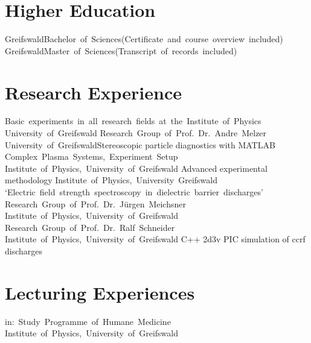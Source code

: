 \documentclass[11pt,a4paper]{moderncv}
\begin{document}
	\section{Higher Education} 
					{Greifswald}{Bachelor~of~Sciences}{(Certificate~and~course~overview~included)}
					{Greifswald}{Master~of~Sciences}{(Transcript~of~records~included)}
	
	\newpage
	\section{Research Experience}
					{Basic~experiments~in~all~research~fields~at~the~Institute~of~Physics\newline}{}%
					{University~of~Greifswald}{}
					{Research~Group~of~Prof.~Dr.~Andre~Melzer\newline}{}%
					{University~of~Greifswald\newline}{Stereoscopic particle diagnostics with MATLAB}
					{Complex~Plasma~Systems,~Experiment~Setup\newline}{}%
					{Institute~of~Physics,~University~of~Greifswald}{}
					{Advanced experimental methodology\newline}{}%
					{Institute~of~Physics,~University~Greifswald}{}
					{`Electric~field~strength~spectroscopy~in~dielectric~barrier~discharges'\newline}{}%
					{Research~Group~of~Prof.~Dr.~Jürgen~Meichsner\newline}%
					{Institute~of~Physics,~University~of~Greifswald}
					{Research~Group~of~Prof.~Dr.~Ralf~Schneider\newline}{}%
					{Institute~of~Physics,~University~of~Greifswald\newline}%
					{C++ 2d3v PIC simulation of ccrf discharges}
	
	\section{Lecturing Experiences}
											{in:~Study~Programme~of~Humane~Medicine\newline}{}%
											{Institute~of~Physics,~University~of~Greifswald}{}
	
\end{document}
